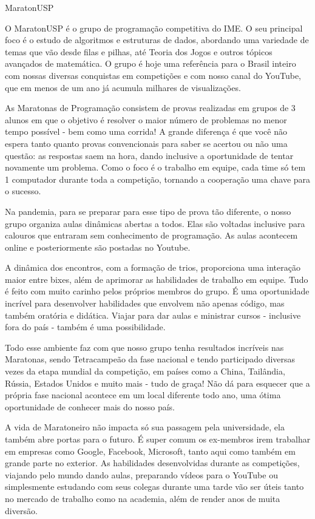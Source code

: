 \begin{subsecao}{MaratonUSP}

O MaratonUSP é o grupo de programação competitiva do IME. O seu principal foco é o estudo de algoritmos e estruturas de dados, abordando uma variedade de temas que vão desde filas e pilhas, até Teoria dos Jogos e outros tópicos avançados de matemática. O grupo é hoje uma referência para o Brasil inteiro com nossas diversas conquistas em competições e com nosso canal do YouTube, que em menos de um ano já acumula milhares de visualizações. 

As Maratonas de Programação consistem de provas realizadas em grupos de 3 alunos em que o objetivo é resolver o maior número de problemas no menor tempo possível - bem como uma corrida! A grande diferença é que você não espera tanto quanto provas convencionais para saber se acertou ou não uma questão: as respostas saem na hora, dando inclusive a oportunidade de tentar novamente um problema. Como o foco é o trabalho em equipe, cada time só tem 1 computador durante toda a competição, tornando a cooperação uma chave para o sucesso. 

Na pandemia, para se preparar para esse tipo de prova tão diferente, o nosso grupo organiza aulas dinâmicas abertas a todos. Elas são voltadas inclusive para calouros que entraram sem conhecimento de programação. As aulas acontecem online e posteriormente são postadas no Youtube. 

A dinâmica dos encontros, com a formação de trios, proporciona uma interação maior entre bixes, além de aprimorar as habilidades de trabalho em equipe. Tudo é feito com muito carinho pelos próprios membros do grupo. É uma oportunidade incrível para desenvolver habilidades que envolvem não apenas código, mas também oratória e didática. Viajar para dar aulas e ministrar cursos - inclusive fora do país - também é uma possibilidade.

Todo esse ambiente faz com que nosso grupo tenha resultados incríveis nas Maratonas, sendo Tetracampeão da fase nacional e tendo participado diversas vezes da etapa mundial da competição, em países como a China, Tailândia, Rússia, Estados Unidos e muito mais - tudo de graça! Não dá para esquecer que a própria fase nacional acontece em um local diferente todo ano, uma ótima oportunidade de conhecer mais do nosso país. 

A vida de Maratoneiro não impacta só sua passagem pela universidade, ela também abre portas para o futuro. É super comum os ex-membros irem trabalhar em empresas como Google, Facebook, Microsoft, tanto aqui como também em grande parte no exterior. As habilidades desenvolvidas durante as competições, viajando pelo mundo dando aulas, preparando vídeos para o YouTube ou simplesmente estudando com seus colegas durante uma tarde vão ser úteis tanto no mercado de trabalho como na academia, além de render anos de muita diversão.


\end{subsecao}
